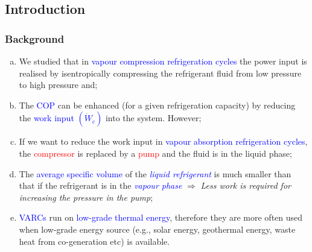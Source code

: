 \documentclass[10pt,compress]{beamer}
\begin{document}
\subsection{Introduction}
\begin{frame}
 \frametitle{Background}
  \begin{enumerate}[(a)]
   \item <1-> We studied that in \textcolor{blue}{vapour compression refrigeration cycles} the power input is realised by isentropically compressing the refrigerant fluid from low pressure to high pressure and;
   \item <2-> The \textcolor{blue}{COP} can be enhanced (for a given refrigeration capacity) by reducing the \textcolor{blue}{work input $\left(\dot{W}_{c}\right)$} into the system. However;
   \item <3-> If we want to reduce the work input in \textcolor{blue}{vapour absorption refrigeration cycles}, the \textcolor{red}{compressor} is replaced by a \textcolor{red}{pump} and the fluid is in the liquid phase;
   \item <4-> The \textcolor{blue}{average specific volume} of the \textcolor{blue}{\it liquid refrigerant} is much smaller than that if the refrigerant is in the \textcolor{blue}{\it vapour phase} $\Longrightarrow$ {\it Less work is required for increasing the pressure in the pump};
   \item <5-> \textcolor{blue}{VARCs} run on \textcolor{blue}{low-grade thermal energy}, therefore they are more often used when low-grade energy source (e.g., solar energy, geothermal energy, waste heat from co-generation etc) is available.
  \end{enumerate}
\end{frame}
\end{document}
